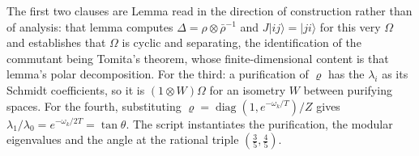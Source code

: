 The first two clauses are Lemma  read in the direction of construction rather than of analysis: that lemma computes $\Delta = \rho\otimes\bar\rho^{-1}$ and $J|ij\rangle = |ji\rangle$ for this very $\Omega$ and establishes that $\Omega$ is cyclic and separating, the identification of the commutant being Tomita's theorem, whose finite-dimensional content is that lemma's polar decomposition. For the third: a purification of $\varrho$ has the $\lambda_i$ as its Schmidt coefficients, so it is $(1\otimes W)\Omega$ for an isometry $W$ between purifying spaces. For the fourth, substituting $\varrho = \operatorname{diag}(1, e^{-\omega_k/T})/Z$ gives $\lambda_1/\lambda_0 = e^{-\omega_k/2T} = \tan\theta$. The script instantiates the purification, the modular eigenvalues and the angle at the rational triple $(\tfrac35, \tfrac45)$.

